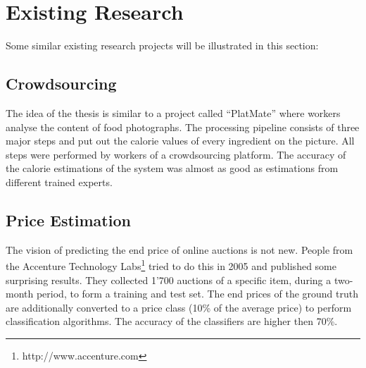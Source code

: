 \documentclass[a4paper]{report}
\begin{document}
\section{Existing Research}
Some similar existing research projects will be illustrated in this section: 
\subsection{Crowdsourcing}
The idea of the thesis is similar to a project called ``PlatMate''\cite{platemate} where workers analyse the content of food photographs. The processing pipeline consists of three major steps and put out the calorie values of every ingredient on the picture. All steps were performed by workers of a crowdsourcing platform. The accuracy of the calorie estimations of the system was almost as good as estimations from different trained experts. 
\subsection{Price Estimation}
The vision of predicting the end price of online auctions is not new. People from the Accenture Technology Labs\footnote{http://www.accenture.com} tried to do this in 2005 and published some surprising results\cite{ghani}. They collected 1'700 auctions of a specific item, during a two-month period, to form a training and test set. The end prices of the ground truth are additionally converted to a price class (10\% of the average price) to perform classification algorithms. The accuracy of the classifiers are higher then 70\%.
\end{document}
